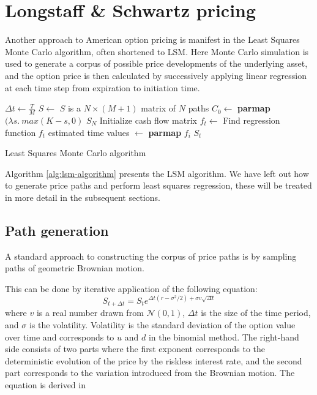 \section{Longstaff \& Schwartz pricing}
Another approach to American option pricing is manifest in the Least
Squares Monte Carlo algorithm, often shortened to LSM. Here Monte
Carlo simulation is used to generate a corpus of possible price
developments of the underlying asset, and the option price is then
calculated by successively applying linear regression at each time
step from expiration to initiation time.


\begin{algorithm}
  \begin{algorithmic}
    \State $\Delta t \gets \frac{T}{M}$
    \State $S \gets$  \Comment $S$ is a $N \times (M+1)$ matrix of $N$ paths
    \State $C_0 \gets $ \textbf{parmap} $(\lambda s.\ max(K-s, 0)$ $S_N$ \Comment Initialize cash flow matrix
    \State $f_t \gets$  \Comment Find regression function $f_t$
    \State estimated time values $\gets$ \textbf{parmap} $f_i$ $S_t$
    \EndFor
    \EndFunction
  \end{algorithmic}
  
  \caption{Least Squares Monte Carlo algorithm}
  \label{alg:lsm-algorithm}
\end{algorithm}

Algorithm \ref{alg:lsm-algorithm} presents the LSM algorithm. We have
left out how to generate price paths and perform least squares
regression, these will be treated in more detail in the subsequent
sections.

\subsection{Path generation}
A standard approach to constructing the corpus of price paths is by
sampling paths of geometric Brownian motion.

This can be done by iterative application of the following equation:
$$S_{t+\Delta t}=S_te^{\Delta t(r-\sigma^2/2) + \sigma v\sqrt{\Delta t}}$$ where 
$v$ is a real number drawn from $\mathcal{N}(0,1)$, $\Delta t$ is the
size of the time period, and $\sigma$ is the volatility. Volatility is
the standard deviation of the option value over time and corresponds
to $u$ and $d$ in the binomial method. The right-hand side consists of
two parts where the first exponent corresponds to the deterministic
evolution of the price by the riskless interest rate, and the second
part corresponds to the variation introduced from the Brownian
motion. The equation is derived in 

